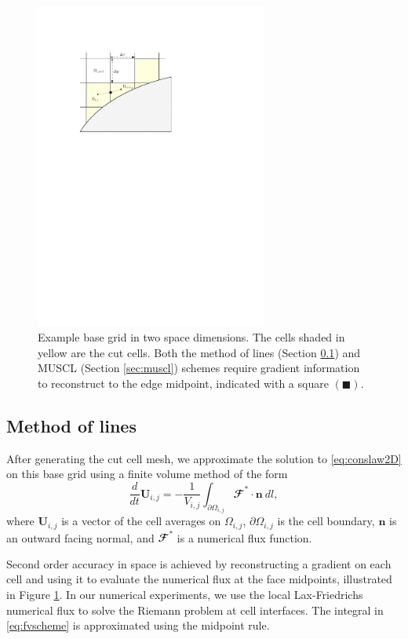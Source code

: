 \begin{figure}
\begin{center}
\includegraphics[width=3.0in]{figs/example_ccmesh.pdf}
\caption{\sf Example base grid in two space dimensions. The cells shaded
in yellow are the cut cells.  Both the method of lines (Section
\ref{sec:mol}) and MUSCL (Section \ref{sec:muscl}) schemes require
gradient information to reconstruct to the edge midpoint, indicated with
a square $(\blacksquare)$.} 
\label{fig:2dfig}
\end{center}
\end{figure}


\subsection{Method of lines} \label{sec:mol}

After generating the cut cell mesh, we approximate the solution to \eqref{eq:conslaw2D} on this base grid using a finite volume method of the form
\begin{equation}\label{eq:fvscheme}
\frac{d}{dt}\mathbf{U}_{i,j} =- \frac{1}{V_{i,j}} \int_{\partial \Omega_{i,j}} \mathbfcal{F} ^* \cdot \mathbf{n} ~dl,
\end{equation}
where $\mathbf{U}_{i,j}$ is a vector of the cell averages on $\Omega_{i,j}$, $\partial \Omega_{i,j}$ is the cell boundary, $\mathbf{n}$ is an outward facing normal, and $\mathbfcal{F}^*$ is a numerical flux function.

Second order accuracy in space is achieved by reconstructing a gradient on each
cell and using it to evaluate the numerical flux at the face midpoints,
illustrated in Figure \ref{fig:2dfig}.  
In our numerical experiments, we use the local Lax-Friedrichs numerical 
flux to solve the Riemann problem at cell interfaces. The integral in \eqref{eq:fvscheme} is  approximated using the midpoint rule.

